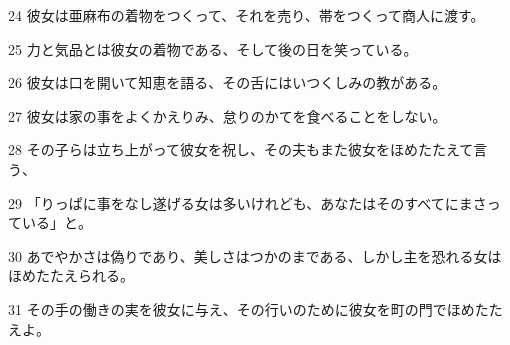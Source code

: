 \par 24 彼女は亜麻布の着物をつくって、それを売り、帯をつくって商人に渡す。
\par 25 力と気品とは彼女の着物である、そして後の日を笑っている。
\par 26 彼女は口を開いて知恵を語る、その舌にはいつくしみの教がある。
\par 27 彼女は家の事をよくかえりみ、怠りのかてを食べることをしない。
\par 28 その子らは立ち上がって彼女を祝し、その夫もまた彼女をほめたたえて言う、
\par 29 「りっぱに事をなし遂げる女は多いけれども、あなたはそのすべてにまさっている」と。
\par 30 あでやかさは偽りであり、美しさはつかのまである、しかし主を恐れる女はほめたたえられる。
\par 31 その手の働きの実を彼女に与え、その行いのために彼女を町の門でほめたたえよ。


